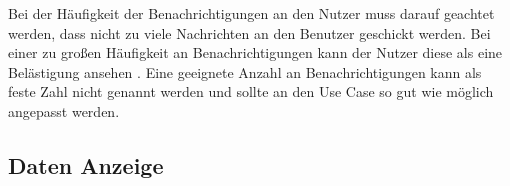 Bei der Häufigkeit der Benachrichtigungen an den Nutzer muss darauf geachtet werden, dass nicht zu viele Nachrichten an den Benutzer geschickt werden. Bei einer zu großen Häufigkeit an Benachrichtigungen kann der Nutzer diese als eine Belästigung ansehen \cite{gadgets:amountnotifications}. Eine geeignete Anzahl an Benachrichtigungen kann als feste Zahl nicht genannt werden und sollte an den Use Case so gut wie möglich angepasst werden.

\subsection{Daten Anzeige}